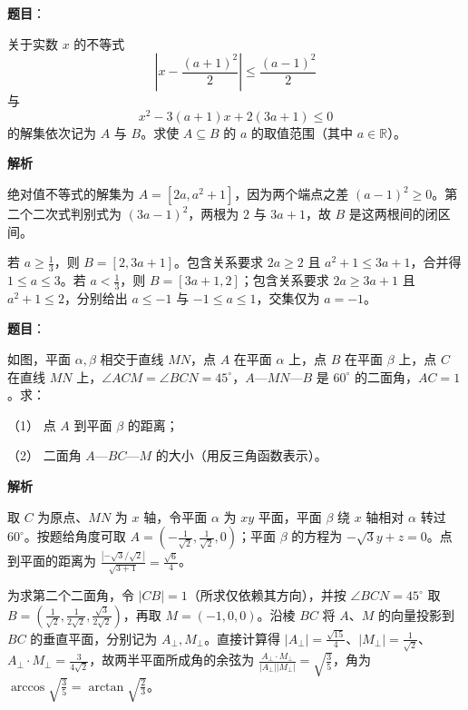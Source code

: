 \begin{answer}

\textbf{题目}：

关于实数 $x$ 的不等式
\nopagebreak[4]
\[
\left|x-\frac{(a+1)^2}{2}\right|\leq\frac{(a-1)^2}{2}
\]
与
\nopagebreak[4]
\[
x^2-3(a+1)x+2(3a+1)\leq0
\]
的解集依次记为 $A$ 与 $B$。求使 $A\subseteq B$ 的 $a$ 的取值范围（其中 $a\in\mathbb R$）。

\textbf{解析}

绝对值不等式的解集为 $A=[2a,a^2+1]$，因为两个端点之差 $(a-1)^2\ge0$。第二个二次式判别式为 $(3a-1)^2$，两根为 $2$ 与 $3a+1$，故 $B$ 是这两根间的闭区间。

若 $a\ge\frac13$，则 $B=[2,3a+1]$。包含关系要求 $2a\ge2$ 且 $a^2+1\le3a+1$，合并得 $1\le a\le3$。若 $a<\frac13$，则 $B=[3a+1,2]$；包含关系要求 $2a\ge3a+1$ 且 $a^2+1\le2$，分别给出 $a\le-1$ 与 $-1\le a\le1$，交集仅为 $a=-1$。


\end{answer}
\begin{answer}

\textbf{题目}：

如图，平面 $\alpha,\beta$ 相交于直线 $MN$，点 $A$ 在平面 $\alpha$ 上，点 $B$ 在平面 $\beta$ 上，点 $C$ 在直线 $MN$ 上，$\angle ACM=\angle BCN=45^\circ$，$A$—$MN$—$B$ 是 $60^\circ$ 的二面角，$AC=1$。求：

（1） 点 $A$ 到平面 $\beta$ 的距离；

（2） 二面角 $A$—$BC$—$M$ 的大小（用反三角函数表示）。
\nopagebreak[4]
\begin{center}\end{center}
\nopagebreak[4]
\textbf{解析}


取 $C$ 为原点、$MN$ 为 $x$ 轴，令平面 $\alpha$ 为 $xy$ 平面，平面 $\beta$ 绕 $x$ 轴相对 $\alpha$ 转过 $60^\circ$。按题给角度可取 $A=(-\frac1{\sqrt2},\frac1{\sqrt2},0)$；平面 $\beta$ 的方程为 $-\sqrt3y+z=0$。点到平面的距离为 $\frac{| -\sqrt3/\sqrt2|}{\sqrt{3+1}}=\frac{\sqrt6}{4}$。


为求第二个二面角，令 $|CB|=1$（所求仅依赖其方向），并按 $\angle BCN=45^\circ$ 取 $B=(\frac1{\sqrt2},\frac1{2\sqrt2},\frac{\sqrt3}{2\sqrt2})$，再取 $M=(-1,0,0)$。沿棱 $BC$ 将 $A$、$M$ 的向量投影到 $BC$ 的垂直平面，分别记为 $A_\perp,M_\perp$。直接计算得 $|A_\perp|=\frac{\sqrt{15}}4$、$|M_\perp|=\frac1{\sqrt2}$、$A_\perp\cdot M_\perp=\frac3{4\sqrt2}$，故两半平面所成角的余弦为 $\frac{A_\perp\cdot M_\perp}{|A_\perp||M_\perp|}=\sqrt{\frac35}$，角为 $\arccos\sqrt{\frac35}=\arctan\sqrt{\frac23}$。



\end{answer}
